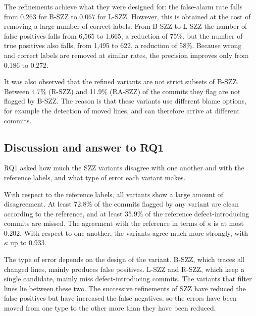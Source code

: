 \documentclass[12pt,a4paper,oneside]{report}
\begin{document}
The refinements achieve what they were designed for: the false-alarm rate
falls from 0.263 for B-SZZ to 0.067 for L-SZZ. However, this is obtained at
the cost of removing a large number of correct labels. From B-SZZ to L-SZZ
the number of false positives falls from 6,565 to 1,665, a reduction of 75\%,
but the number of true positives also falls, from 1,495 to 622, a reduction
of 58\%. Because wrong and correct labels are removed at similar rates, the
precision improves only from 0.186 to 0.272.

It was also observed that the refined variants are not strict subsets of
B-SZZ. Between 4.7\% (R-SZZ) and 11.9\% (RA-SZZ) of the commits they flag are
not flagged by B-SZZ. The reason is that these variants use different blame
options, for example the detection of moved lines, and can therefore arrive
at different commits.

\subsection{Discussion and answer to RQ1}

RQ1 asked how much the SZZ variants disagree with one another and with the
reference labels, and what type of error each variant makes.

With respect to the reference labels, all variants show a large amount of
disagreement. At least 72.8\% of the commits flagged by any variant are clean
according to the reference, and at least 35.9\% of the reference
defect-introducing commits are missed. The agreement with the reference in
terms of $\kappa$ is at most 0.202. With respect to one another, the variants
agree much more strongly, with $\kappa$ up to 0.933.

The type of error depends on the design of the variant. B-SZZ, which traces
all changed lines, mainly produces false positives. L-SZZ and R-SZZ, which
keep a single candidate, mainly miss defect-introducing commits. The variants
that filter lines lie between these two. The successive refinements of SZZ
have reduced the false positives but have increased the false negatives, so
the errors have been moved from one type to the other more than they have
been reduced.
\end{document}
